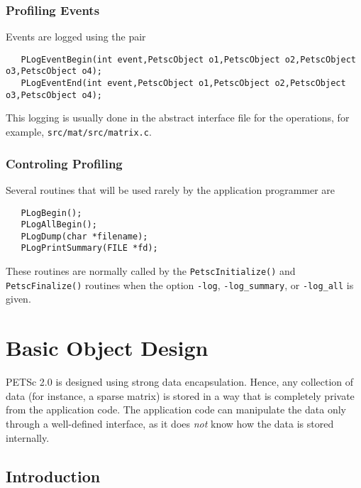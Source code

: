 \subsection{Profiling Events}

Events are logged using the 
pair 
\begin{verbatim}
   PLogEventBegin(int event,PetscObject o1,PetscObject o2,PetscObject o3,PetscObject o4);
   PLogEventEnd(int event,PetscObject o1,PetscObject o2,PetscObject o3,PetscObject o4);
\end{verbatim}
This logging is usually done in the abstract
interface file for the operations, for example, {\tt src/mat/src/matrix.c}.

\subsection{Controling Profiling}

Several routines that will be used rarely by the 
application programmer 
are    
\begin{verbatim}
   PLogBegin();
   PLogAllBegin();
   PLogDump(char *filename);
   PLogPrintSummary(FILE *fd);
\end{verbatim}
These routines are normally called by the {\tt PetscInitialize()}
and {\tt PetscFinalize()} routines when the option {\tt -log}, 
{\tt -log\_summary}, or 
{\tt -log\_all} is given.

\chapter{Basic Object Design}
\label{chapter:design}

PETSc 2.0 is designed using strong data encapsulation.  Hence,
any collection of data (for instance, a sparse matrix) is stored in 
a way that is completely private from the application code. The application 
code can manipulate the data only through a well-defined interface, as it 
does {\em not} know how the data is stored internally. 

\section{Introduction}

